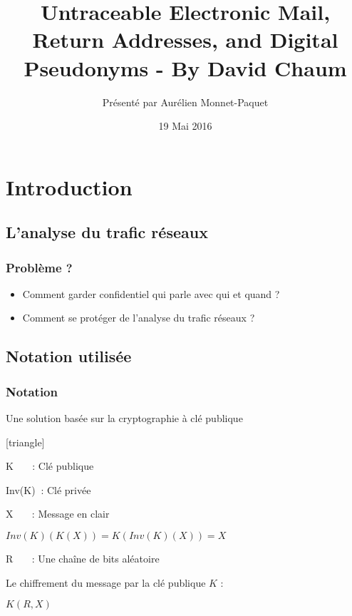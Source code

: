 \documentclass{beamer}
\title{Untraceable Electronic Mail, Return Addresses, and Digital Pseudonyms - By David Chaum}
\author{Présenté par Aurélien Monnet-Paquet}
\institute{www.inria.fr}
\date{19 Mai 2016}
\begin{document}
\begin{frame}
\titlepage
\end{frame}

\section{Introduction}
\subsection{L'analyse du trafic réseaux}
\begin{frame}
\frametitle{Problème ?}
\begin{itemize}
[triangle]
\item Comment garder confidentiel qui parle avec qui et quand ?
\pause
\item Comment se protéger de l'analyse du trafic réseaux ?
\end{itemize}
\end{frame}

\subsection{Notation utilisée}
\begin{frame}
\frametitle{Notation}
\begin{block}{}
Une solution basée sur la cryptographie à clé publique
\end{block}
\begin{itemize}
[triangle]
\item K $~~~~~~~$: Clé publique
\item Inv(K) $~$: Clé privée
\item X $~~~~~~~$: Message en clair
\pause
\item $Inv(K)( K( X ) ) = K( Inv(K)( X ) ) = X$
\pause
\item R $~~~~~~~$: Une chaîne de bits aléatoire
\pause
\item Le chiffrement du message par la clé publique $K$ :
\begin{center}
\item $K( R, X )$
\end{center}
\end{itemize}
\end{frame}

\end{document}
